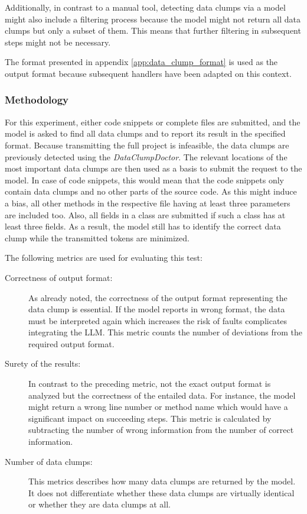 Additionally, in contrast to a manual tool, detecting data clumps via  a model might also include a filtering process because the model might not return all data clumps but only a subset of them. This means that further filtering in subsequent steps might not be necessary. 

The format presented in appendix \ref{app:data_clump_format} is used as the output format because subsequent handlers have been adapted on this context. 


\subsubsection{Methodology}

For this experiment, either code snippets or complete files are submitted, and the model is asked to find all data clumps and to report its result in the specified format.
Because transmitting the full project is infeasible, the data clumps are previously detected using the \textit{DataClumpDoctor}. The relevant locations of the most important data clumps are then used as a basis to submit the request to the model. In case of code snippets, this would mean that the code snippets only contain data clumps and no other parts of the source code. As this might induce a bias, all other methods in the respective file having at least three parameters are included too. Also, all fields in a class are submitted if such a class has at least three fields. As a result, the model still has to identify the correct data clump while  the transmitted tokens are minimized.  


The following metrics are used for evaluating this test:

\begin{description}

    \item[Correctness of output format:]
    As already noted, the correctness of the output format representing the data clump is essential. If the model reports in wrong format, the data must be interpreted again which increases the risk of faults complicates integrating the \ac{LLM}. This metric counts the number of deviations from the required output format.

     \item [Surety of the results:] In contrast to the preceding metric, not the exact output format is analyzed but the correctness of the entailed data. For instance, the model might return a wrong line number or method name which would have a significant impact on succeeding steps. This metric is calculated by subtracting the number of wrong information from the number of correct information. 

     \item [Number of data clumps:] This metrics describes how many data clumps are returned by the model. It does not differentiate whether these data clumps are virtually identical or whether they are data clumps at all. 
     

   

    

   
\end{description}



